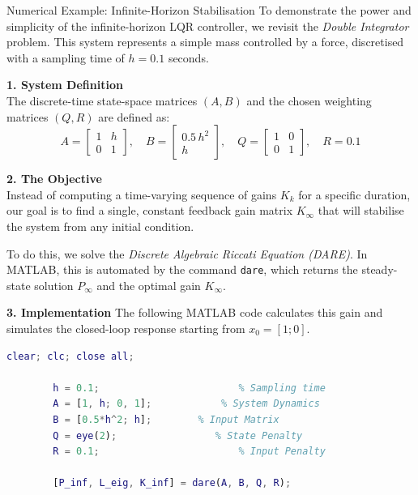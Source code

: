\begin{examplebox}{Numerical Example: Infinite-Horizon Stabilisation}
	To demonstrate the power and simplicity of the infinite-horizon LQR controller, we revisit the \emph{Double Integrator} problem. This system represents a simple mass controlled by a force, discretised with a sampling time of $h=0.1$ seconds.
	
	\textbf{1. System Definition} \\
	The discrete-time state-space matrices $(A, B)$ and the chosen weighting matrices $(Q, R)$ are defined as:
	\begin{equation*}
		A = \begin{bmatrix} 1 & h \\ 0 & 1 \end{bmatrix}, \quad 
		B = \begin{bmatrix} 0.5\, h^2 \\ h \end{bmatrix}, \quad 
		Q = \begin{bmatrix} 1 & 0 \\ 0 & 1 \end{bmatrix}, \quad 
		R = 0.1
	\end{equation*}
	
	\textbf{2. The Objective} \\
	Instead of computing a time-varying sequence of gains $K_k$ for a specific duration, our goal is to find a single, constant feedback gain matrix $K_{\infty}$ that will stabilise the system from any initial condition. 
	
	To do this, we solve the \emph{Discrete Algebraic Riccati Equation (DARE)}. In MATLAB, this is automated by the command \texttt{dare}, which returns the steady-state solution $P_{\infty}$ and the optimal gain $K_{\infty}$.
	
	\textbf{3. Implementation}
	The following MATLAB code calculates this gain and simulates the closed-loop response starting from $x_0 = [1; 0]$.
	
	\begin{lstlisting}[language=Matlab, caption={MATLAB code for infinite-horizon LQR control using the \texttt{dare} command.}, label=lst:matlab_dare]
		clear; clc; close all;
		
		h = 0.1;               			% Sampling time
		A = [1, h; 0, 1];      		 % System Dynamics
		B = [0.5*h^2; h];   	 % Input Matrix
		Q = eye(2);            		% State Penalty
		R = 0.1;               			% Input Penalty
		
		[P_inf, L_eig, K_inf] = dare(A, B, Q, R);
		

\end{lstlisting}
\end{examplebox}
